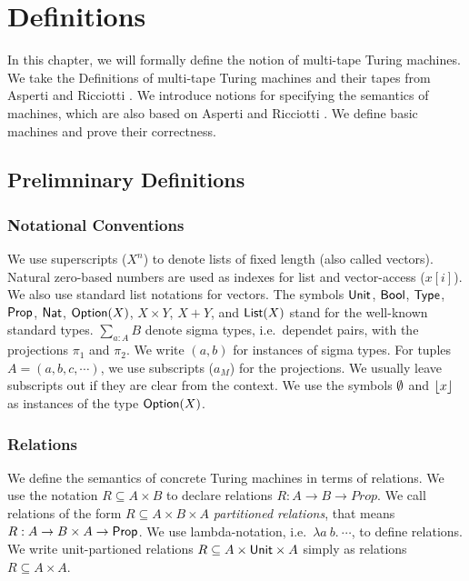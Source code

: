 \chapter{Definitions}
\label{chap:definitions}

In this chapter, we will formally define the notion of multi-tape Turing machines.  We take the Definitions of multi-tape Turing machines and their
tapes from Asperti and Ricciotti \cite{asperti2015}.  We introduce notions for specifying the semantics of machines, which are also based on Asperti
and Ricciotti \cite{asperti2015}.  We define basic machines and prove their correctness.

\section{Prelimninary Definitions}
\label{sec:prelim}


\subsection{Notational Conventions}
\label{sec:notational-conventions}

We use superscripts ($X^n$) to denote lists of fixed length (also called vectors).  Natural zero-based numbers are used as indexes for list and
vector-access ($x[i]$).  We also use standard list notations for vectors.  The symbols $\textsf{Unit}$, $\textsf{Bool}$, $\textsf{Type}$, $\textsf{Prop}$, $\textsf{Nat}$, $\textsf{Option}(X)$,
$X \times Y$, $X + Y$, and $\textsf{List}(X)$ stand for the well-known standard types.  $\sum_{a:A} B$ denote sigma types, i.e.\ dependet pairs, with the
projections $\pi_1$ and $\pi_2$.  We write $(a,b)$ for instances of sigma types. For tuples $A = (a, b, c, \cdots)$, we use subscripts ($a_M$) for the
projections.  We usually leave subscripts out if they are clear from the context.  We use the symbols $\emptyset$ and $\left\lfloor {x} \right\rfloor$ as instances of the type
$\textsf{Option}(X)$.


\subsection{Relations}
\label{sec:relations}

We define the semantics of concrete Turing machines in terms of relations.  We use the notation $R \subseteq A \times B$ to declare relations
$R : A \to B \to Prop$.  We call relations of the form $R \subseteq A \times B \times A$ \emph{partitioned relations}, that means
$R : A \rightarrow B \times A \rightarrow \textsf{Prop}$.  We use lambda-notation, i.e.\ $\lambda a~b.~\cdots$, to define relations.  We write unit-partioned relations
$R \subseteq A \times \textsf{Unit} \times A$ simply as relations $R \subseteq A \times A$.

